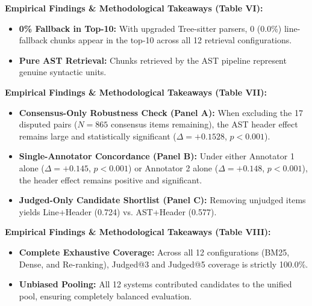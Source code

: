 \documentclass[11pt,a4paper,landscape]{article}
\begin{document}

\FloatBarrier
\vspace{-0.1cm}
{\small
\noindent\textbf{Empirical Findings \& Methodological Takeaways (Table VI):}
\begin{itemize}[nosep,topsep=2pt,partopsep=0pt,itemsep=2pt]
    \item \textbf{0\% Fallback in Top-10:} With upgraded Tree-sitter parsers, 0 (0.0\%) line-fallback chunks appear in the top-10 across all 12 retrieval configurations.
    \item \textbf{Pure AST Retrieval:} Chunks retrieved by the AST pipeline represent genuine syntactic units.
\end{itemize}
}
\clearpage


\FloatBarrier
\vspace{-0.1cm}
{\small
\noindent\textbf{Empirical Findings \& Methodological Takeaways (Table VII):}
\begin{itemize}[nosep,topsep=2pt,partopsep=0pt,itemsep=2pt]
    \item \textbf{Consensus-Only Robustness Check (Panel A):} When excluding the 17 disputed pairs ($N=865$ consensus items remaining), the AST header effect remains large and statistically significant ($\Delta = +0.1528$, $p < 0.001$).
    \item \textbf{Single-Annotator Concordance (Panel B):} Under either Annotator 1 alone ($\Delta = +0.145$, $p < 0.001$) or Annotator 2 alone ($\Delta = +0.148$, $p < 0.001$), the header effect remains positive and significant.
    \item \textbf{Judged-Only Candidate Shortlist (Panel C):} Removing unjudged items yields Line+Header (0.724) vs. AST+Header (0.577).
\end{itemize}
}
\clearpage


\FloatBarrier
\vspace{-0.1cm}
{\small
\noindent\textbf{Empirical Findings \& Methodological Takeaways (Table VIII):}
\begin{itemize}[nosep,topsep=2pt,partopsep=0pt,itemsep=2pt]
    \item \textbf{Complete Exhaustive Coverage:} Across all 12 configurations (BM25, Dense, and Re-ranking), Judged@3 and Judged@5 coverage is strictly 100.0\%.
    \item \textbf{Unbiased Pooling:} All 12 systems contributed candidates to the unified pool, ensuring completely balanced evaluation.
\end{itemize}
}
\clearpage
\end{document}

